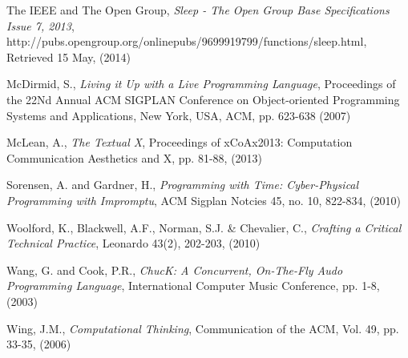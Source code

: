 \documentclass[11pt]{scrartcl}
\begin{document}
\begin{thebibliography}{9}
  The IEEE and The Open Group,
  \emph{Sleep - The Open Group Base Specifications Issue 7, 2013},
  http://pubs.opengroup.org/onlinepubs/9699919799/functions/sleep.html,
  Retrieved 15 May,
  (2014)

  McDirmid, S.,
  \emph{Living it Up with a Live Programming Language},
  Proceedings of the 22Nd Annual ACM SIGPLAN Conference on Object-oriented Programming Systems and Applications,
  New York, USA,
  ACM, pp. 623-638
  (2007)

  McLean, A.,
  \emph{The Textual X},
  Proceedings of xCoAx2013: Computation Communication Aesthetics and X,
  pp. 81-88,
  (2013)

  Sorensen, A. and Gardner, H.,
  \emph{Programming with Time: Cyber-Physical Programming with Impromptu},
  ACM Sigplan Notcies 45,
  no. 10, 822-834,
  (2010)

  Woolford, K., Blackwell, A.F., Norman, S.J. \& Chevalier, C.,
  \emph{Crafting a Critical Technical Practice},
  Leonardo 43(2),
  202-203,
  (2010)

  Wang, G. and Cook, P.R.,
  \emph{ChucK: A Concurrent, On-The-Fly Audo Programming Language},
  International Computer Music Conference,
  pp. 1-8,
  (2003)

  Wing, J.M.,
  \emph{Computational Thinking},
  Communication of the ACM,
  Vol. 49, pp. 33-35,
  (2006)

\end{thebibliography}
\end{document}
